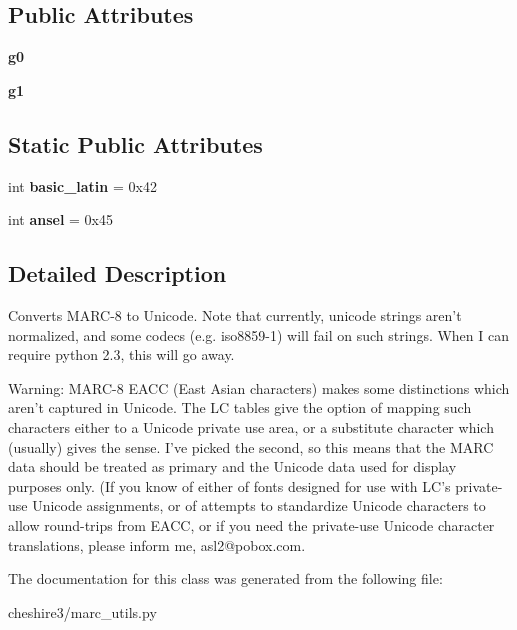 \subsection*{Public Attributes}
\begin{DoxyCompactItemize}
\item 
\hypertarget{classcheshire3_1_1marc__utils_1_1_m_a_r_c8__to___unicode_a0641f915633e6ef0b6f073aac501f376}{{\bfseries g0}}\label{classcheshire3_1_1marc__utils_1_1_m_a_r_c8__to___unicode_a0641f915633e6ef0b6f073aac501f376}

\item 
\hypertarget{classcheshire3_1_1marc__utils_1_1_m_a_r_c8__to___unicode_a7f2d8df19b610997a22776be92695f98}{{\bfseries g1}}\label{classcheshire3_1_1marc__utils_1_1_m_a_r_c8__to___unicode_a7f2d8df19b610997a22776be92695f98}

\end{DoxyCompactItemize}
\subsection*{Static Public Attributes}
\begin{DoxyCompactItemize}
\item 
\hypertarget{classcheshire3_1_1marc__utils_1_1_m_a_r_c8__to___unicode_a7ecea29c23994082449031ea69170790}{int {\bfseries basic\-\_\-latin} = 0x42}\label{classcheshire3_1_1marc__utils_1_1_m_a_r_c8__to___unicode_a7ecea29c23994082449031ea69170790}

\item 
\hypertarget{classcheshire3_1_1marc__utils_1_1_m_a_r_c8__to___unicode_a5924b58f463ca434c76f23fe01913feb}{int {\bfseries ansel} = 0x45}\label{classcheshire3_1_1marc__utils_1_1_m_a_r_c8__to___unicode_a5924b58f463ca434c76f23fe01913feb}

\end{DoxyCompactItemize}


\subsection{Detailed Description}
\begin{DoxyVerb}Converts MARC-8 to Unicode.  Note that currently, unicode strings
aren't normalized, and some codecs (e.g. iso8859-1) will fail on
such strings.  When I can require python 2.3, this will go away.

Warning: MARC-8 EACC (East Asian characters) makes some
distinctions which aren't captured in Unicode.  The LC tables give
the option of mapping such characters either to a Unicode private
use area, or a substitute character which (usually) gives the
sense.  I've picked the second, so this means that the MARC data
should be treated as primary and the Unicode data used for display
purposes only.  (If you know of either of fonts designed for use
with LC's private-use Unicode assignments, or of attempts to
standardize Unicode characters to allow round-trips from EACC,
or if you need the private-use Unicode character translations,
please inform me, asl2@pobox.com.\end{DoxyVerb}
 

The documentation for this class was generated from the following file\-:\begin{DoxyCompactItemize}
\item 
cheshire3/marc\-\_\-utils.\-py\end{DoxyCompactItemize}
